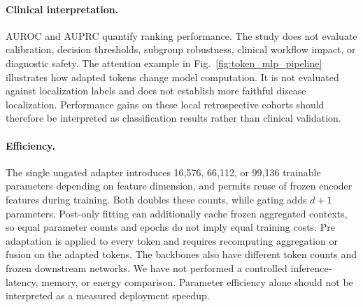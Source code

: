 \documentclass[10pt,twocolumn,letterpaper]{article}
\begin{document}
\paragraph{Clinical interpretation.}
AUROC and AUPRC quantify ranking performance. The study does not evaluate calibration, decision thresholds, subgroup robustness, clinical workflow impact, or diagnostic safety. The attention example in Fig.~\ref{fig:token_mlp_pipeline} illustrates how adapted tokens change model computation. It is not evaluated against localization labels and does not establish more faithful disease localization. Performance gains on these local retrospective cohorts should therefore be interpreted as classification results rather than clinical validation.

\paragraph{Efficiency.}
The single ungated adapter introduces 16,576, 66,112, or 99,136 trainable parameters depending on feature dimension, and permits reuse of frozen encoder features during training. Both doubles these counts, while gating adds $d+1$ parameters. Post-only fitting can additionally cache frozen aggregated contexts, so equal parameter counts and epochs do not imply equal training costs. Pre adaptation is applied to every token and requires recomputing aggregation or fusion on the adapted tokens. The backbones also have different token counts and frozen downstream networks. We have not performed a controlled inference-latency, memory, or energy comparison. Parameter efficiency alone should not be interpreted as a measured deployment speedup.
\end{document}

